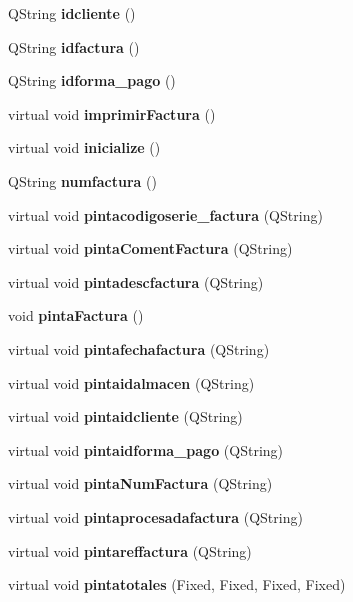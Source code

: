 \begin{CompactItemize}
\item 
QString {\bf idcliente} ()\label{classFactura_a16}

\item 
QString {\bf idfactura} ()\label{classFactura_a17}

\item 
QString {\bf idforma\_\-pago} ()\label{classFactura_a18}

\item 
virtual void {\bf imprimir\-Factura} ()
\item 
virtual void {\bf inicialize} ()\label{classFactura_a20}

\item 
QString {\bf numfactura} ()\label{classFactura_a21}

\item 
virtual void {\bf pintacodigoserie\_\-factura} (QString)\label{classFactura_a22}

\item 
virtual void {\bf pinta\-Coment\-Factura} (QString)\label{classFactura_a23}

\item 
virtual void {\bf pintadescfactura} (QString)\label{classFactura_a24}

\item 
void {\bf pinta\-Factura} ()
\item 
virtual void {\bf pintafechafactura} (QString)\label{classFactura_a26}

\item 
virtual void {\bf pintaidalmacen} (QString)\label{classFactura_a27}

\item 
virtual void {\bf pintaidcliente} (QString)\label{classFactura_a28}

\item 
virtual void {\bf pintaidforma\_\-pago} (QString)\label{classFactura_a29}

\item 
virtual void {\bf pinta\-Num\-Factura} (QString)\label{classFactura_a30}

\item 
virtual void {\bf pintaprocesadafactura} (QString)\label{classFactura_a31}

\item 
virtual void {\bf pintareffactura} (QString)\label{classFactura_a32}

\item 
virtual void {\bf pintatotales} (Fixed, Fixed, Fixed, Fixed)\label{classFactura_a33}


\end{CompactItemize}
